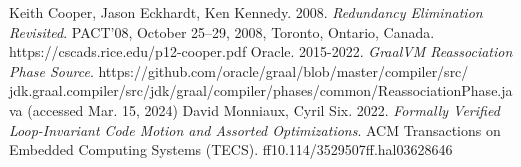 \documentclass[12pt,openany,a4paper]{book}
\begin{document}
\begin{thebibliography}{99}
 Keith Cooper, Jason Eckhardt, Ken Kennedy. 2008. \emph{Redundancy Elimination Revisited}. PACT’08, October 25–29, 2008, Toronto, Ontario, Canada. https://cscads.rice.edu/p12-cooper.pdf
 Oracle. 2015-2022. \emph{GraalVM Reassociation Phase Source}. https://github.com/oracle/graal/blob/master/compiler/src/\\jdk.graal.compiler/src/jdk/graal/compiler/phases/common/ReassociationPhase.java (accessed Mar. 15, 2024)
 David Monniaux, Cyril Six. 2022. \emph{Formally Verified Loop-Invariant Code Motion and Assorted Optimizations}. ACM Transactions on Embedded Computing Systems (TECS). ff10.114/3529507ff.hal03628646
\end{thebibliography}
\end{document}
